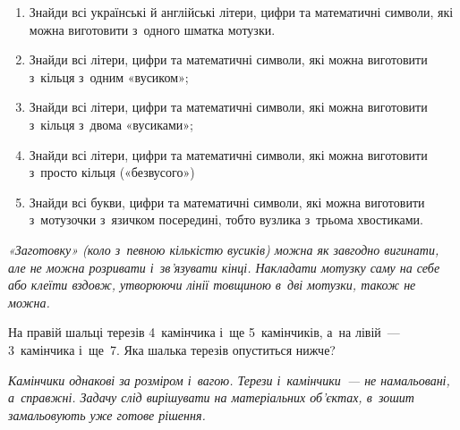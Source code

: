 \begin{enumerate}
    \item Знайди всі українські й англійські літери, цифри
    та математичні символи, які можна виготовити з~одного шматка мотузки.
    \item Знайди всі літери, цифри та математичні символи,
    які можна виготовити з~кільця з~одним «вусиком»;
    \item Знайди всі літери, цифри та математичні символи,
    які можна виготовити з~кільця з~двома «вусиками»;
    \item Знайди всі літери, цифри та математичні символи,
    які можна виготовити з~просто кільця («безвусого»)
    \item Знайди всі букви, цифри та математичні символи,
    які можна виготовити з~мотузочки з~язичком посередині,
    тобто вузлика з~трьома хвостиками.
\end{enumerate}

\emph{
«Заготовку» (коло з~певною кількістю вусиків) можна як завгодно вигинати,
але не можна розривати і~зв'язувати кінці.
Накладати мотузку саму на себе або клеїти вздовж,
утворюючи лінії товщиною в~дві мотузки, також не можна.
}


\problem
На правій шальці терезів 4~камінчика і~ще 5~камінчиків,
а~на лівій~--- 3~камінчика і~ще~7.
Яка шалька терезів опуститься нижче?

\emph{
Камінчики однакові за розміром і~вагою.
Терези і~камінчики~--- не намальовані, а~справжні.
Задачу слід вирішувати на матеріальних об’єктах,
в~зошит замальовують уже готове рішення.
}


